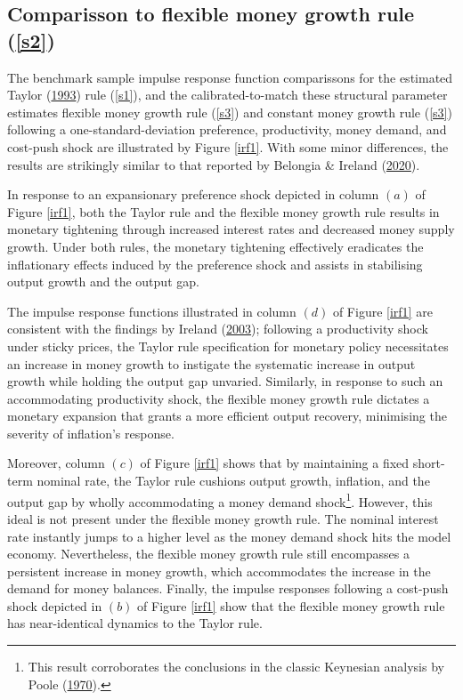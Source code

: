 \documentclass[11pt,preprint, authoryear]{elsarticle}
\numberwithin{equation}{section}
\numberwithin{figure}{section}
\numberwithin{table}{section}
\let\rmarkdownfootnote\footnote%
\def\footnote{\protect\rmarkdownfootnote}
\begin{document}
\hypertarget{comparisson-to-flexible-money-growth-rule}{%
\subsection{\texorpdfstring{Comparisson to flexible money growth rule
(\ref{s2})}{Comparisson to flexible money growth rule ()}}\label{comparisson-to-flexible-money-growth-rule}}

The benchmark sample impulse response function comparissons for the
estimated Taylor (\protect\hyperlink{ref-taylor1993}{1993}) rule
(\ref{s1}), and the calibrated-to-match these structural parameter
estimates flexible money growth rule (\ref{s3}) and constant money
growth rule (\ref{s3}) following a one-standard-deviation preference,
productivity, money demand, and cost-push shock are illustrated by
Figure \ref{irf1}. With some minor differences, the results are
strikingly similar to that reported by Belongia \& Ireland
(\protect\hyperlink{ref-belongia2020}{2020}).

In response to an expansionary preference shock depicted in column
\((a)\) of Figure \ref{irf1}, both the Taylor rule and the flexible
money growth rule results in monetary tightening through increased
interest rates and decreased money supply growth. Under both rules, the
monetary tightening effectively eradicates the inflationary effects
induced by the preference shock and assists in stabilising output growth
and the output gap.

The impulse response functions illustrated in column \((d)\) of Figure
\ref{irf1} are consistent with the findings by Ireland
(\protect\hyperlink{ref-ireland2003}{2003}); following a productivity
shock under sticky prices, the Taylor rule specification for monetary
policy necessitates an increase in money growth to instigate the
systematic increase in output growth while holding the output gap
unvaried. Similarly, in response to such an accommodating productivity
shock, the flexible money growth rule dictates a monetary expansion that
grants a more efficient output recovery, minimising the severity of
inflation's response.

Moreover, column \((c)\) of Figure \ref{irf1} shows that by maintaining
a fixed short-term nominal rate, the Taylor rule cushions output growth,
inflation, and the output gap by wholly accommodating a money demand
shock\footnote{This result corroborates the conclusions in the classic
  Keynesian analysis by Poole (\protect\hyperlink{ref-poole1970}{1970}).}.
However, this ideal is not present under the flexible money growth rule.
The nominal interest rate instantly jumps to a higher level as the money
demand shock hits the model economy. Nevertheless, the flexible money
growth rule still encompasses a persistent increase in money growth,
which accommodates the increase in the demand for money balances.
Finally, the impulse responses following a cost-push shock depicted in
\((b)\) of Figure \ref{irf1} show that the flexible money growth rule
has near-identical dynamics to the Taylor rule.
\end{document}
